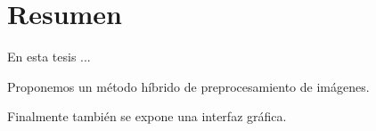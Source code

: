 \chapter*{Resumen}

En esta tesis ...

Proponemos un método híbrido de preprocesamiento de imágenes.

Finalmente también se expone una interfaz gráfica.
\newpage 
